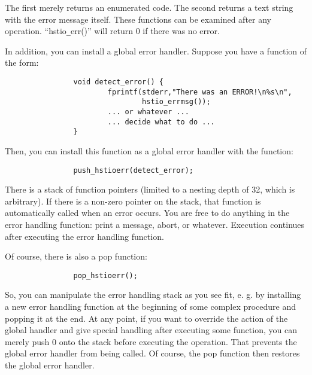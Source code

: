 The first merely returns an enumerated code.  The second returns a text
string with the error message itself.  These functions can be examined
after any operation.  ``hstio\verb+_+err()'' will return 0 if there 
was no error.

In addition, you can install a global error handler.  Suppose you have a
function of the form:

\begin{scriptsize}
\begin{verbatim}
                void detect_error() {
                        fprintf(stderr,"There was an ERROR!\n%s\n",
                                hstio_errmsg());
                        ... or whatever ...
                        ... decide what to do ...
                }
\end{verbatim}
\end{scriptsize}

Then, you can install this function as a global error handler with the 
function:

\begin{scriptsize}
\begin{verbatim}
                push_hstioerr(detect_error);
\end{verbatim}
\end{scriptsize}

There is a stack of function pointers (limited to a nesting depth of 32, 
which is arbitrary).  If there is a non-zero pointer on the stack, that
function is automatically called when an error occurs.  You are free to
do anything in the error handling function: print a message, abort, or 
whatever.  Execution continues after executing the error handling function.

Of course, there is also a pop function:

\begin{scriptsize}
\begin{verbatim}
                pop_hstioerr();
\end{verbatim}
\end{scriptsize}

So, you can manipulate the error handling stack as you see fit, e. g. by
installing a new error handling function at the beginning of some complex
procedure and popping it at the end.  At any point, if you want to override
the action of the global handler and give special handling after executing
some function, you can merely push 0 onto the stack before executing the
operation.  That prevents the global error handler from being called.  Of
course, the pop function then restores the global error handler.

